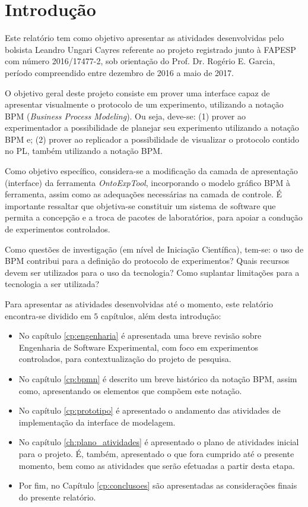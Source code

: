 \chapter{Introdução}

Este relatório tem como objetivo apresentar as atividades desenvolvidas pelo bolsista Leandro Ungari Cayres referente ao projeto  registrado junto à FAPESP com número 2016/17477-2, sob orientação do Prof. Dr. Rogério E. Garcia, período compreendido entre dezembro de 2016 a maio de 2017.

O objetivo geral deste projeto consiste em prover uma interface capaz de apresentar visualmente o protocolo de um experimento, utilizando a notação BPM (\textit{Business Process Modeling}). Ou seja, deve-se: (1) prover ao experimentador a possibilidade de planejar seu experimento utilizando a notação BPM e; (2) prover ao replicador a possibilidade de visualizar o protocolo contido no PL, também utilizando a notação BPM.

Como objetivo específico, considera-se a modificação da camada de apresentação (interface) da ferramenta \textit{OntoExpTool}, incorporando o modelo gráfico BPM à ferramenta, assim como as adequações necessárias na camada de controle. É importante ressaltar que objetiva-se constituir um sistema de software que permita a concepção e a troca de pacotes de laboratórios, para apoiar a condução de experimentos controlados.

Como questões de investigação (em nível de Iniciação Científica), tem-se: o uso de BPM contribui para a definição do protocolo de experimentos? Quais recursos devem ser utilizados para o uso da tecnologia? Como suplantar limitações para a tecnologia a ser utilizada?

Para apresentar as atividades desenvolvidas até o momento, este relatório encontra-se dividido em $5$ capítulos, além desta introdução:

\begin{itemize}

\item No capítulo \ref{cp:engenharia} é apresentada uma breve revisão sobre Engenharia de Software Experimental, com foco em experimentos controlados, para contextualização do projeto de pesquisa.

\item No capítulo \ref{cp:bpmn} é descrito um breve histórico da notação BPM, assim como, apresentando os elementos que compõem este notação.

\item No capítulo \ref{cp:prototipo} é apresentado o andamento das atividades de implementação da interface de modelagem.

\item No capítulo \ref{ch:plano_atividades} é apresentado o plano de atividades inicial para o projeto. É, também, apresentado o que fora cumprido até o presente momento, bem como as atividades que serão efetuadas a partir desta etapa.

\item Por fim, no Capítulo \ref{cp:conclusoes} são apresentadas as considerações finais do presente relatório.
\end{itemize}
     

